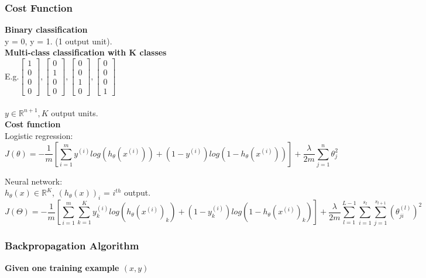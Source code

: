 \documentclass{article}
\begin{document}
\subsubsection{Cost Function}
\textbf{Binary classification}\\
y = 0, y = 1. (1 output unit). \\

\textbf{Multi-class classification with K classes}\\

E.g.$\begin{bmatrix}
1 \\ 0 \\ 0 \\ 0
\end{bmatrix},
\begin{bmatrix}
0 \\ 1 \\ 0 \\ 0
\end{bmatrix},
\begin{bmatrix}
0 \\ 0 \\ 1 \\ 0
\end{bmatrix},
\begin{bmatrix}
0 \\ 0 \\ 0 \\ 1
\end{bmatrix}$\\\\

$y \in \mathbb{R}^{n+1}, K$ output units.\\

\textbf{Cost function}\\

Logistic regression:\\
$$J(\theta) = -\frac{1}{m}[\sum_{i=1}^{m}y^{(i)}log(h_\theta(x^{(i)})) + (1-y^{(i)})log(1-h_\theta(x^{(i)}))] + \frac{\lambda}{2m} \sum_{j=1}^n \theta_{j}^2$$

Neural network:\\
$h_\theta(x) \in \mathbb{R}^{K}$, $(h_\theta(x))_i$ = $i^{th}$ output.\\
$$J(\Theta) = -\frac{1}{m}[\sum_{i=1}^{m}\sum_{k=1}^{K}y_k^{(i)}log(h_\theta(x^{(i)})_k) + (1-y^{(i)}_k)log(1-h_\theta(x^{(i)})_k)] + \frac{\lambda}{2m} \sum_{l=1}^{L-1}\sum_{i=1}^{s_l}\sum_{j=1}^{s_{l+1}} (\theta_{ji}^{(l)})^2$$


\subsubsection{Backpropagation Algorithm}
\textbf{Given one training example $(x, y)$}\\
\end{document}
